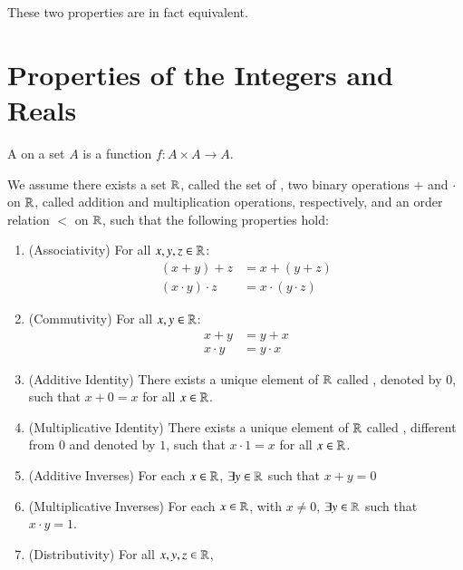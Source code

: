 \documentclass[12pt, a4paper, oneside, openright, titlepage]{book}
\begin{document}
\begin{appendices}
\begin{definition}
        These two properties are in fact equivalent.
    \end{definition}


    \section{Properties of the Integers and Reals}


    \begin{definition}
        A  on a set $A$ is a function $f:A\times A\rightarrow A$.
    \end{definition}


    \begin{construction}
        We assume there exists a set $\mathbb R$, called the set of , two binary operations $+$ and $\cdot$ on $\mathbb R$, called addition and multiplication operations, respectively, and an order relation $<$ on $\mathbb R$, such that the following properties hold: \begin{enumerate}
            \item (Associativity) For all $x,y,z \in \mathbb R$:\begin{align}
                    (x+y)+z &= x+(y+z) \\
                    (x\cdot y)\cdot z &= x\cdot (y\cdot z) 
                \end{align}
            \item (Commutivity) For all $x,y \in \mathbb R$:\begin{align}
                x+y &= y+x \\
                x\cdot y &= y \cdot x
                \end{align}
            \item (Additive Identity) There exists a unique element of $\mathbb R$ called , denoted by $0$, such that $x+0 = x$ for all $x \in \mathbb R$.
            \item (Multiplicative Identity) There exists a unique element of $\mathbb R$ called , different from $0$ and denoted by $1$, such that $x\cdot 1 = x$ for all $x \in \mathbb R$.
            \item (Additive Inverses) For each $x \in\mathbb R$, $\exists y \in \mathbb R$ such that $x+y = 0$
            \item (Multiplicative Inverses) For each $x \in \mathbb R$, with $x \neq 0$, $\exists y \in \mathbb R$ such that $x\cdot y = 1$.
            \item (Distributivity) For all $x,y,z \in \mathbb R$, \begin{equation}

\end{equation}
\end{enumerate}
\end{construction}
\end{appendices}
\end{document}

